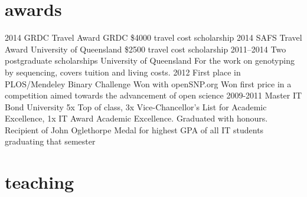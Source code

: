\documentclass[]{friggeri-cv} %
\begin{document}

\section{awards}

\begin{entrylist}
\entry
{2014}
{GRDC Travel Award}
{GRDC}
{\$4000 travel cost scholarship}
\entry
{2014}
{SAFS Travel Award}
{University of Queensland}
{\$2500 travel cost scholarship}
\entry
{2011--2014}
{Two postgraduate scholarships}
{University of Queensland}
{For the work on genotyping by sequencing, covers tuition and living costs.}
\entry
{2012}
{First place in PLOS/Mendeley Binary Challenge}
{Won with openSNP.org}
{Won first price in a competition aimed towards the advancement of open science}
\entry
{2009-2011}
{Master IT}
{Bond University}
{5x Top of class,  3x Vice-Chancellor's List for Academic Excellence, 1x IT Award Academic Excellence. Graduated with honours. Recipient of John Oglethorpe Medal for highest GPA of all IT students graduating that semester}
\end{entrylist}



\section{teaching}
\end{document}
